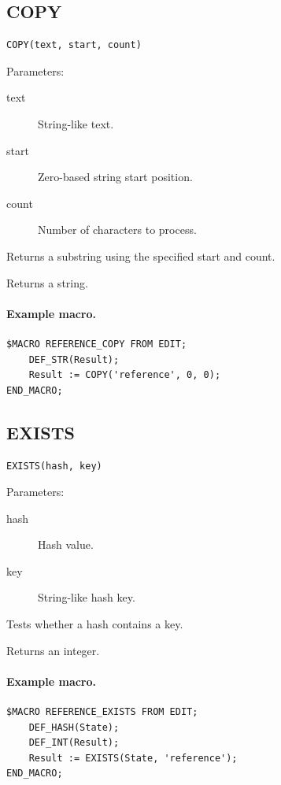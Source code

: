 \documentclass[a4paper,10pt,twoside,openany]{book}
\newenvironment{mrmacextension}{\begin{changebar}}{\end{changebar}}
\begin{document}
\label{prim:intrinsic-copy}
\subsection*{COPY}
\begin{verbatim}
COPY(text, start, count)
\end{verbatim}
Parameters:
\begin{description}
\item[text] String-like text.
\item[start] Zero-based string start position.
\item[count] Number of characters to process.
\end{description}

Returns a substring using the specified start and count.

Returns a string.

\paragraph{Example macro.}
\begin{verbatim}
$MACRO REFERENCE_COPY FROM EDIT;
    DEF_STR(Result);
    Result := COPY('reference', 0, 0);
END_MACRO;
\end{verbatim}

\begin{mrmacextension}
\label{prim:intrinsic-exists}
\subsection*{EXISTS}
\begin{verbatim}
EXISTS(hash, key)
\end{verbatim}
Parameters:
\begin{description}
\item[hash] Hash value.
\item[key] String-like hash key.
\end{description}

Tests whether a hash contains a key.

Returns an integer.

\paragraph{Example macro.}
\begin{verbatim}
$MACRO REFERENCE_EXISTS FROM EDIT;
    DEF_HASH(State);
    DEF_INT(Result);
    Result := EXISTS(State, 'reference');
END_MACRO;
\end{verbatim}
\end{mrmacextension}
\end{document}
